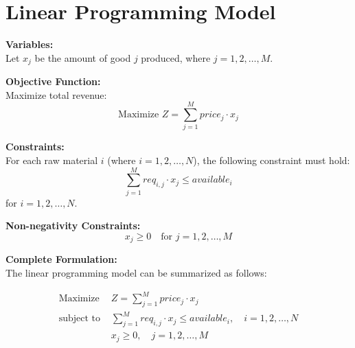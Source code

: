 \documentclass{article}
\begin{document}
\section*{Linear Programming Model}

\textbf{Variables:} \\
Let \( x_j \) be the amount of good \( j \) produced, where \( j = 1, 2, \ldots, M \).

\textbf{Objective Function:} \\
Maximize total revenue:
\[
\text{Maximize } Z = \sum_{j=1}^{M} price_j \cdot x_j
\]

\textbf{Constraints:} \\
For each raw material \( i \) (where \( i = 1, 2, \ldots, N \)), the following constraint must hold:
\[
\sum_{j=1}^{M} req_{i,j} \cdot x_j \leq available_i
\]
for \( i = 1, 2, \ldots, N \).

\textbf{Non-negativity Constraints:} \\
\[
x_j \geq 0 \quad \text{for } j = 1, 2, \ldots, M
\]

\textbf{Complete Formulation:} \\
The linear programming model can be summarized as follows:

\begin{align*}
\text{Maximize } & Z = \sum_{j=1}^{M} price_j \cdot x_j \\
\text{subject to } & \sum_{j=1}^{M} req_{i,j} \cdot x_j \leq available_i, \quad i = 1, 2, \ldots, N \\
& x_j \geq 0, \quad j = 1, 2, \ldots, M
\end{align*}
\end{document}
